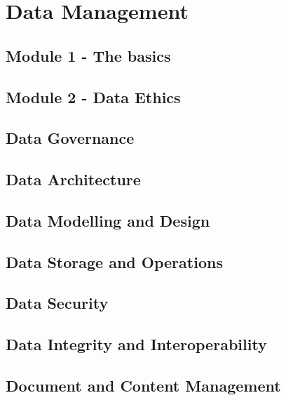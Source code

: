 

\part{Data Management}
\chapter{Module 1 - The basics}

\chapter{Module 2 - Data Ethics}

\chapter{Data Governance}

\chapter{Data Architecture}

\chapter{Data Modelling and Design}

\chapter{Data Storage and Operations}

\chapter{Data Security}

\chapter{Data Integrity and Interoperability}

\chapter{Document and Content Management}

